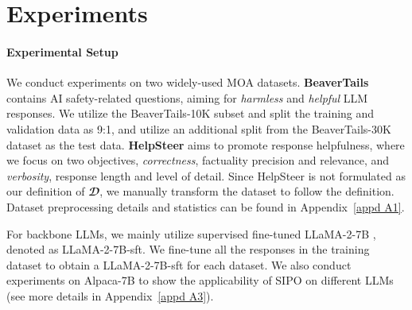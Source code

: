 \section{Experiments} \label{sec:experiments}
\paragraph{Experimental Setup}

We conduct experiments on two widely-used MOA datasets. 
\textbf{BeaverTails} \cite{DBLP:conf/nips/JiLDPZB0SW023} contains AI safety-related questions, aiming for \textit{harmless} and \textit{helpful} LLM responses. 
We utilize the BeaverTails-10K subset and split the training and validation data as 9:1, and utilize an additional split from the BeaverTails-30K dataset as the test data. 
\textbf{HelpSteer} aims to promote response helpfulness, where we focus on two objectives, \textit{correctness}, \ie factuality precision and relevance, and \textit{verbosity}, \ie response length and level of detail. 
Since HelpSteer is not formulated as our definition of $\mathbfcal{D}$, we manually transform the dataset to follow the definition. 
Dataset preprocessing details and statistics can be found in Appendix~\ref{appd A1}. 

For backbone LLMs, we mainly utilize supervised fine-tuned LLaMA-2-7B \cite{DBLP:journals/corr/abs-2307-09288}, denoted as LLaMA-2-7B-sft. 
We fine-tune all the responses in the training dataset to obtain a LLaMA-2-7B-sft for each dataset. We also conduct experiments on Alpaca-7B \cite{alpaca} to show the applicability of SIPO on different LLMs (see more details in Appendix~\ref{appd A3}). 


